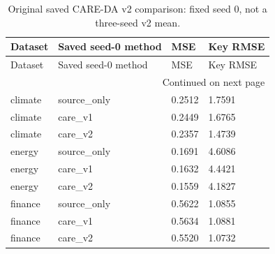 {\footnotesize
\setlength{\tabcolsep}{3pt}
\renewcommand{\arraystretch}{1.17}
\begin{longtable}{@{}p{}p{}p{}p{}@{}}
\caption{Original saved CARE-DA v2 comparison: fixed seed 0, not a three-seed v2 mean.}\label{tab:v2_table}\\
\toprule
Dataset & Saved seed-0 method & MSE & Key RMSE \\
\midrule\endfirsthead
Dataset & Saved seed-0 method & MSE & Key RMSE \\
\midrule\endhead
\midrule\multicolumn{4}{r}{Continued on next page}\\\endfoot
\bottomrule\endlastfoot
climate & source\_\allowbreak{}only & 0.2512 & 1.7591 \\
climate & care\_\allowbreak{}v1 & 0.2449 & 1.6765 \\
climate & care\_\allowbreak{}v2 & 0.2357 & 1.4739 \\
energy & source\_\allowbreak{}only & 0.1691 & 4.6086 \\
energy & care\_\allowbreak{}v1 & 0.1632 & 4.4421 \\
energy & care\_\allowbreak{}v2 & 0.1559 & 4.1827 \\
finance & source\_\allowbreak{}only & 0.5622 & 1.0855 \\
finance & care\_\allowbreak{}v1 & 0.5634 & 1.0881 \\
finance & care\_\allowbreak{}v2 & 0.5520 & 1.0732 \\
\end{longtable}
}

